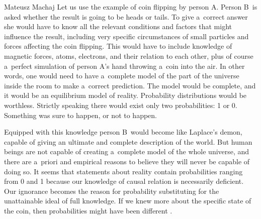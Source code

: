 \begin{artengenv}{Mateusz Machaj}
Let us use the example of coin flipping by person A. Person B~is asked whether the result is going to be heads or tails. To give a~correct answer she would have to know all the relevant conditions and factors that might influence the result, including very specific circumstances of small particles and forces affecting the coin flipping. This would have to include knowledge of magnetic forces, atoms, electrons, and their relation to each other, plus of course a~perfect simulation of person A's hand throwing a~coin into the air. In other words, one would need to have a~complete model of the part of the universe inside the room to make a~correct prediction. The model would be complete, and it would be an equilibrium model of reality. Probability distributions would be worthless. Strictly speaking there would exist only two probabilities: 1 or 0. Something was sure to happen, or not to happen.



Equipped with this knowledge person B~would become like Laplace's demon, capable of giving an ultimate and complete description of the world. But human beings are not capable of creating a~complete model of the whole universe, and there are a~priori and empirical reasons to believe they will never be capable of doing so. It seems that statements about reality contain probabilities ranging from 0 and 1 because our knowledge of causal relation is necessarily deficient. Our ignorance becomes the reason for probability substituting for the unattainable ideal of full knowledge. If we knew more about the specific state of the coin, then probabilities might have been different 
\parencite[][pp.179–180]{reeves_theory_1988}.%





\end{artengenv}
